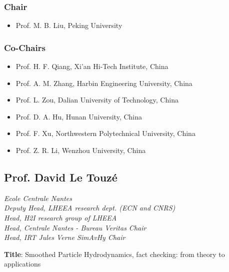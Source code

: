 \subsubsection*{Chair}\vspace{-1em}
\begin{itemize}
\item Prof.   M. B. Liu, Peking University
\end{itemize}

\subsubsection*{Co-Chairs}\vspace{-1em}
\begin{itemize}
\item Prof.   H. F. Qiang, Xi'an Hi-Tech Institute, China
\item Prof.   A. M. Zhang, Harbin Engineering University, China
\item Prof.   L. Zou, Dalian University of Technology, China
\item Prof.   D. A. Hu, Hunan University, China
\item Prof.   F. Xu, Northwestern Polytechnical University, China
\item Prof.   Z. R. Li, Wenzhou University, China
\end{itemize}


\newpage
{}
{}
\subsection*{Prof.  David Le Touzé}\label{David}
\textit{Ecole Centrale Nantes}\\
\textit{Deputy Head, LHEEA research dept. (ECN and CNRS)}\\
\textit{Head, H2I research group of LHEEA}\\
\textit{Head, Centrale Nantes - Bureau Veritas Chair}\\
\textit{Head, IRT Jules Verne SimAvHy Chair}

\textbf{Title}: Smoothed Particle Hydrodynamics, fact checking: from theory to applications


